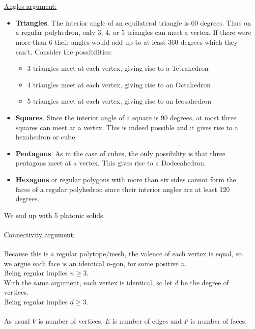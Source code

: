 \documentclass{article}
\begin{document}
\vspace{1.8cm}
\\\\
\underline{Angles argument:}
\\
\begin{itemize}
    \item {\bfseries Triangles}. The interior angle of an equilateral triangle is 60 degrees. Thus on a regular polyhedron, only 3, 4, or 5 triangles can meet a vertex. If there were more than 6 their angles would add up to at least 360 degrees which they can't. Consider the possibilities:
    \begin{itemize}
        \item 3 triangles meet at each vertex, giving rise to a Tetrahedron
        \item 4 triangles meet at each vertex, giving rise to an Octahedron
        \item 5 triangles meet at each vertex, giving rise to an Icosahedron
    \end{itemize}
    \item {\bfseries Squares}. Since the interior angle of a square is 90 degrees, at most three squares can meet at a vertex. This is indeed possible and it gives rise to a hexahedron or cube.
    \item {\bfseries Pentagons}. As in the case of cubes, the only possibility is that three pentagons meet at a vertex. This gives rise to a Dodecahedron.
    \item {\bfseries Hexagons} or regular polygons with more than six sides cannot form the faces of a regular polyhedron since their interior angles are at least 120 degrees.
\end{itemize}
We end up with 5 platonic solids.
\\\\
\underline{Connectivity argument:}
\\\\
Because this is a regular polytope/mesh, the valence of each vertex is equal, so 
we argue each face is an identical $n$-gon, for some positive $n$.\\
Being regular implies $n \ge 3$.\\
With the same argument, each vertex is identical, so let $d$ be the degree of vertices.\\
Being regular implies $d \ge 3$.\\\\
As usual $V$ is number of vertices, $E$ is number of edges and $F$ is number of faces.\\
\end{document}
